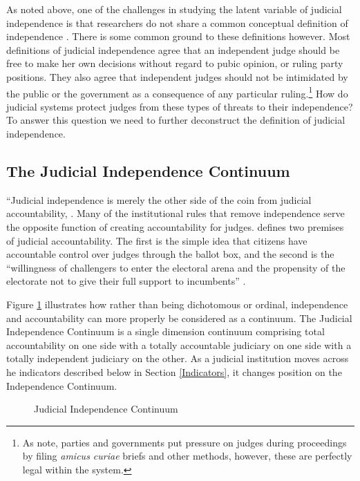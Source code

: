 \documentclass[JohnsonMADraft2.tex]{subfiles}
\begin{document}
As noted above, one of the challenges in studying the latent variable of judicial independence is that researchers do not share a common conceptual definition of independence \citep{Linzer2014}.  There is some common ground to these definitions however.  Most definitions of judicial independence agree that an independent judge should be free to make her own decisions without regard to pubic opinion, or ruling party positions.  They also agree that independent judges should not be intimidated by the public or the government as a consequence of any particular ruling.\footnote{As \citet[4]{Rios2014} note, parties and governments put pressure on judges during proceedings by filing \textit{amicus curiae} briefs and other methods, however, these are perfectly legal within the system.}  How do judicial systems protect judges from these types of threats to their independence?  To answer this question we need to further deconstruct the definition of judicial independence. 

\subsection*{The Judicial Independence Continuum}
``Judicial independence is merely the other side of the coin from judicial accountability, \citep{Burbank2008}.  Many of the institutional rules that remove independence serve the opposite function of creating accountability for judges.  \citet{Hall2007} defines two premises of judicial accountability. The first is the simple idea that citizens have accountable control over judges through the ballot box, and the second is the ``willingness of challengers to enter the electoral arena and the propensity of the electorate not to give their full support to incumbents'' \citep[166]{Hall2007}.

Figure \ref{IndCon} illustrates how rather than being dichotomous or ordinal, independence and accountability can more properly be considered as a continuum.  The Judicial Independence Continuum is a single dimension continuum comprising total accountability on one side with a totally accountable judiciary on one side with a totally independent judiciary on the other.  As a judicial institution moves across he indicators described below in Section \ref{Indicators}, it changes position on the Independence Continuum. 

\begin{figure}[tb]\centering\caption{Judicial Independence Continuum}\label{IndCon}
\end{figure}
\end{document}

